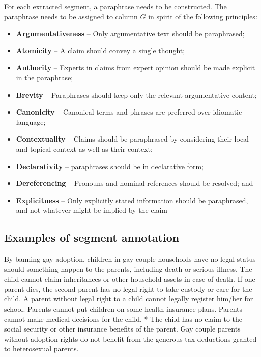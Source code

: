 For each extracted segment, a paraphrase needs to be constructed. The paraphrase needs to
be assigned to column $G$ in spirit of the following principles:
\begin{itemize}
\item \textbf{Argumentativeness} -- Only argumentative text should be paraphrased; 
\item \textbf{Atomicity} -- A claim should convey a single thought; 
\item \textbf{Authority} -- Experts in claims from expert opinion should be made explicit in the paraphrase; 
\item \textbf{Brevity} -- Paraphrases should keep only the relevant argumentative content; 
\item \textbf{Canonicity} -- Canonical terms and phrases are preferred over idiomatic language;
\item \textbf{Contextuality} -- Claims should be paraphrased by considering their local and
topical context as well as their context;
\item \textbf{Declarativity} -- paraphrases should 
be in declarative form;
\item \textbf{Dereferencing} -- Pronouns and nominal  references
should be  resolved;  and
\item \textbf{Explicitness} -- Only explicitly stated
information should be paraphrased, and not whatever might be implied by the claim
\end{itemize}

\subsection*{Examples of segment annotation}

\begin{mydef}
By banning gay adoption, children in gay couple households have no legal status
should something happen to the parents, including death or serious illness.
The child cannot claim inheritances or other household assets in case of death.
If one parent dies, the second parent has no legal right to take custody or
care for the child.   A parent without legal right to a child cannot legally
register him/her for school.   Parents cannot put children on some health
insurance plans.   Parents cannot make medical decisions for the child.   * The
child has no claim to the social security or other insurance benefits of the
parent.   Gay couple parents without adoption rights do not benefit from the
generous tax deductions granted to heterosexual parents.
\end{mydef}

